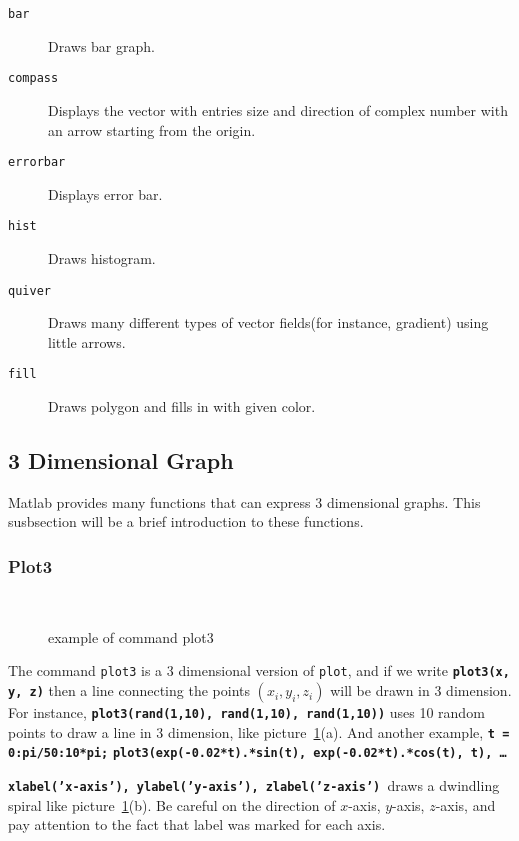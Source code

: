 \begin{description}
\item[\tt bar] \hfil\par Draws bar graph. \item[\tt compass] \hfil\par Displays the vector with entries size and direction of complex number with an arrow starting from the origin.
\item[\tt errorbar] \hfil\par Displays error bar. \item[\tt hist] \hfil\par Draws histogram. \item[\tt quiver] \hfil\par Draws many different types of vector fields(for instance, gradient) using little arrows.
\item[\tt fill] \hfil\par Draws polygon and fills in with given color.
\end{description}

\subsection{3 Dimensional Graph}
Matlab provides many functions that can express 3 dimensional graphs. This susbsection will be a brief introduction to these functions.

\subsubsection{Plot3}

\begin{figure}
\centering
\mbox{%
 \quad
{}} \quad
\caption{example of command plot3}\label{plot3}
\end{figure}

The command {\tt plot3} is a 3 dimensional version of {\tt plot}, and if we write \matlabp\texttt{\textbf{plot3(x, y, z)}} \vn then a line connecting the points $(x_i, y_i, z_i)$ will be drawn in 3 dimension. For instance, \matlabp\texttt{\textbf{plot3(rand(1,10), rand(1,10), rand(1,10))}} \vn uses 10 random points to draw a line in 3 dimension, like picture~\ref{plot3}(a). And another example, \matlabp\texttt{\textbf{t = 0:pi/50:10*pi;}} \matlabp\texttt{\textbf{plot3(exp(-0.02*t).*sin(t), exp(-0.02*t).*cos(t), t), \ldots}} \par\texttt{\textbf{xlabel('x-axis'), ylabel('y-axis'), zlabel('z-axis') }}\vn draws a dwindling spiral like picture~\ref{plot3}(b). Be careful on the direction of $x$-axis, $y$-axis, $z$-axis, and pay attention to the fact that label was marked for each axis.

